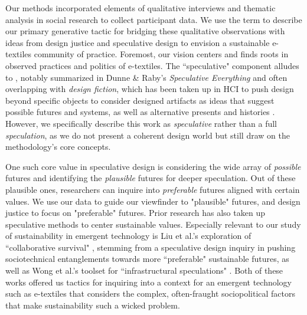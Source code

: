 Our methods incorporated elements of qualitative interviews \cite{braun_online_2020, fontana_interviewing_2007} and thematic analysis \cite{maguire_doing_2017, braun_using_2006} in social research to collect participant data.
We use the term  to describe our primary generative tactic for bridging these qualitative observations with ideas from design justice and speculative design to envision a sustainable e-textiles community of practice. Foremost, our vision centers  \cite{costanza-chock_design_2020} and finds roots in observed practices and politics of e-textiles. The ``speculative" component alludes to , notably summarized in Dunne \& Raby's \textit{Speculative Everything} \cite{dunne_speculative_2013} and often overlapping with \textit{design fiction}, which has been taken up in HCI to push design beyond specific objects to consider designed artifacts as ideas that suggest possible futures and systems, as well as alternative presents and histories \cite{akama_speculative_2016, baumann_infrastructures_2017, wakkary_sustainable_2013}. However, we specifically describe this work as \textit{speculative} rather than a full \textit{speculation}, as we do not present a coherent design world but still draw on the methodology's core concepts.

One such core value in speculative design is considering the wide array of \textit{possible} futures and identifying the \textit{plausible} futures for deeper speculation. Out of these plausible ones, researchers can inquire into \textit{preferable} futures aligned with certain values. We use our data to guide our viewfinder to "plausible" futures, and design justice to focus on "preferable" futures.
Prior research has also taken up speculative methods to center sustainable values. Especially relevant to our study of sustainability in emergent technology is Liu et al.'s exploration of ``collaborative survival" \cite{liu_design_2018}, stemming from a speculative design inquiry in pushing sociotechnical entanglements towards more ``preferable" sustainable futures, as well as Wong et al.'s toolset for ``infrastructural speculations" \cite{wong_infrastructural_2020}. Both of these works offered us tactics for inquiring into a context for an emergent technology such as e-textiles that considers the complex, often-fraught sociopolitical factors that make sustainability such a wicked problem. 

